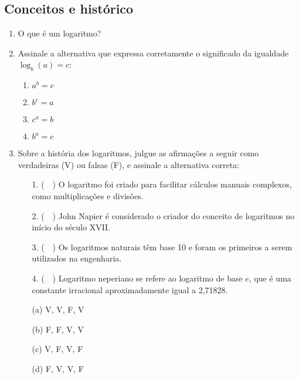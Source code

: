 \documentclass[12pt,a4paper]{article}
\begin{document}
\subsection*{Conceitos e histórico}
\begin{enumerate}
  \item O que é um logaritmo?

  \item Assinale a alternativa que expressa corretamente o significado da igualdade $\log_b(a) = c$:
        \begin{enumerate}
          \item $a^b = c$
          \item $b^c = a$
          \item $c^a = b$
          \item $b^a = c$
        \end{enumerate}

  \item Sobre a história dos logaritmos, julgue as afirmações a seguir como verdadeiras (V) ou falsas (F),
        e assinale a alternativa correta:

        \begin{enumerate}
          \item[1.] (~~) O logaritmo foi criado para facilitar cálculos manuais complexos,
                como multiplicações e divisões.
          \item[2.] (~~) John Napier é considerado o criador do conceito de logaritmos no início do século XVII.
          \item[3.] (~~) Os logaritmos naturais têm base 10 e foram os primeiros a serem utilizados na engenharia.
          \item[4.] (~~) Logaritmo neperiano se refere ao logaritmo de base \(e\), que é uma constante irracional aproximadamente igual a 2{,}71828.
        \end{enumerate}

        \begin{enumerate}
          \item[(a)] V, V, F, V
          \item[(b)] F, F, V, V
          \item[(c)] V, F, V, F
          \item[(d)] F, V, V, F
        \end{enumerate}

\end{enumerate}
\end{document}
